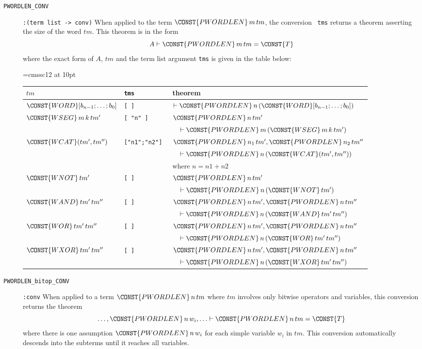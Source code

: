 \begin{description}
\item[{\tt PWORDLEN\_CONV}] \verb|:(term list -> conv)| When applied
to the term $\CONST{PWORDLEN}\,m\, tm$, the
conversion {\tt {} tms} returns a
theorem asserting the size of the word $tm$. This theorem is in the form
\[
A \THM \CONST{PWORDLEN}\,m\, tm = \CONST{T}
\]
where the exact form of $A$, $tm$ and the term list argument {\tt tms}
is given in the table below:
\begin{center}\small \font\sfc=cmssc12 at 10pt\def\constfont{\sfc}
\begin{tabular}{lll}
$tm$ & {\tt tms} & theorem\\ \hline
$\CONST{WORD}[ b_{n-1};\ldots;b_0]$ & \tt[ ] & 
$\THM \CONST{PWORDLEN}\,n\, (\CONST{WORD}[ b_{n-1};\ldots;b_0])$ \\
$\CONST{WSEG}\,m\,k\,tm'$ & \tt [ "n" ] &
$\CONST{PWORDLEN}\,n\,tm'$ \\
 & & $\quad\THM \CONST{PWORDLEN}\,m\,(\CONST{WSEG}\,m\,k\,tm')$ \\
$\CONST{WCAT}(tm',tm'')$ & \tt["n1";"n2"] & 
$\CONST{PWORDLEN}\,n_1\,tm',\CONST{PWORDLEN}\,n_2\,tm''$ \\
 & & $\quad\THM\CONST{PWORDLEN}\,n\,(\CONST{WCAT}(tm',tm''))$\\
 & &  where $ n = n1 + n2$ \\
$\CONST{WNOT}\,tm'$ & \tt[ ] & $\CONST{PWORDLEN}\,n\,tm'$ \\
 & & $\quad\THM\CONST{PWORDLEN}\,n\,(\CONST{WNOT}\,tm')$ \\
$\CONST{WAND}\,tm'\,tm''$ & \tt[ ] &
$\CONST{PWORDLEN}\,n\,tm',\CONST{PWORDLEN}\,n\,tm''$ \\
 & & $\quad \THM\CONST{PWORDLEN}\,n\,(\CONST{WAND}\,tm'\,tm'')$ \\
$\CONST{WOR}\,tm'\,tm''$ & \tt[ ] &
$\CONST{PWORDLEN}\,n\,tm',\CONST{PWORDLEN}\,n\,tm''$ \\
 & & $\quad\THM\CONST{PWORDLEN}\,n\,(\CONST{WOR}\,tm'\,tm'')$ \\
$\CONST{WXOR}\,tm'\,tm''$ & \tt[ ] &
$\CONST{PWORDLEN}\,n\,tm',\CONST{PWORDLEN}\,n\,tm''$ \\
 & & $\quad\THM\CONST{PWORDLEN}\,n\,(\CONST{WXOR}\,tm'\,tm'')$ \\
\end{tabular}
\end{center}

\item[{\tt PWORDLEN\_bitop\_CONV}] \verb|:conv|
When applied to a term $\CONST{PWORDLEN}\,n\,tm$ where $tm$ involves
only bitwise operators and variables, this conversion returns
the theorem 
\[
\ldots,\CONST{PWORDLEN}\,n\,w_i,\ldots \THM \CONST{PWORDLEN}\,n\,tm = \CONST{T}
\]
where there is one assumption $\CONST{PWORDLEN}\,n\,w_i$ for each
simple variable $w_i$ in $tm$. This conversion automatically
descends into the subterms until it reaches all variables.


\end{description}
